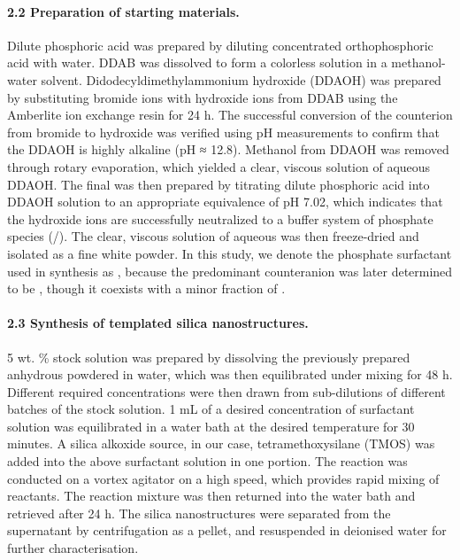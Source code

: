 \documentclass[a4paper,12pt,twocolumn]{article}
\begin{document}
	 \paragraph{2.2 Preparation of starting materials.} Dilute phosphoric acid was prepared by diluting concentrated orthophosphoric acid with water. DDAB was dissolved to form a colorless solution in a methanol-water solvent. Didodecyldimethylammonium hydroxide (DDAOH) was prepared by substituting bromide ions with hydroxide ions from DDAB using the Amberlite ion exchange resin for 24 h. The successful conversion of the counterion from bromide to hydroxide was verified using pH measurements to confirm that the DDAOH is highly alkaline (pH ≈ 12.8). Methanol from DDAOH was removed through rotary evaporation, which yielded a clear, viscous solution of aqueous DDAOH. The final  was then prepared by titrating dilute phosphoric acid into DDAOH solution to an appropriate equivalence of pH 7.02, which indicates that the hydroxide ions are successfully neutralized to a buffer system of phosphate species (/). The clear, viscous solution of aqueous  was then freeze-dried and isolated as a fine white powder. In this study, we denote the phosphate surfactant used in synthesis as , because the predominant counteranion was later determined to be , though it coexists with a minor fraction of .
	 
	 \paragraph{2.3 Synthesis of templated silica nanostructures.} 5 wt. \% stock  solution was prepared by dissolving the previously prepared anhydrous powdered  in water, which was then equilibrated under mixing for 48 h. Different required concentrations were then drawn from sub-dilutions of different batches of the stock solution. 1 mL of a desired concentration of surfactant solution was equilibrated in a water bath at the desired temperature for 30 minutes. A silica alkoxide source, in our case, tetramethoxysilane (TMOS) was added into the above surfactant solution in one portion. The reaction was conducted on a vortex agitator on a high speed, which provides rapid mixing of reactants. The reaction mixture was then returned into the water bath and retrieved after 24 h. The silica nanostructures were separated from the supernatant by centrifugation as a pellet, and resuspended in deionised water for further characterisation.
	 
\end{document}
